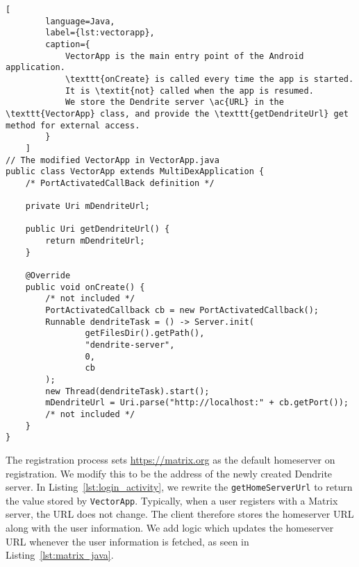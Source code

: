 \begin{lstfloat}
	\begin{lstlisting}[
        language=Java,
        label={lst:vectorapp},
        caption={
            VectorApp is the main entry point of the Android application.
            \texttt{onCreate} is called every time the app is started.
            It is \textit{not} called when the app is resumed.
            We store the Dendrite server \ac{URL} in the \texttt{VectorApp} class, and provide the \texttt{getDendriteUrl} get method for external access.
        }
    ]
// The modified VectorApp in VectorApp.java
public class VectorApp extends MultiDexApplication {
    /* PortActivatedCallBack definition */

    private Uri mDendriteUrl;

    public Uri getDendriteUrl() {
        return mDendriteUrl;
    }

    @Override
    public void onCreate() {
        /* not included */
        PortActivatedCallback cb = new PortActivatedCallback();
        Runnable dendriteTask = () -> Server.init(
                getFilesDir().getPath(),
                "dendrite-server",
                0,
                cb
        );
        new Thread(dendriteTask).start();
        mDendriteUrl = Uri.parse("http://localhost:" + cb.getPort());
        /* not included */
    }
}
\end{lstlisting}
\end{lstfloat}

The registration process sets \url{https://matrix.org} as the default homeserver on registration.
We modify this to be the address of the newly created Dendrite server.
In Listing~\ref{lst:login_activity}, we rewrite the \texttt{getHomeServerUrl} to return the value stored by \texttt{VectorApp}.
Typically, when a user registers with a Matrix server, the \ac{URL} does not change.
The client therefore stores the homeserver \ac{URL} along with the user information.
We add logic which updates the homeserver \ac{URL} whenever the user information is fetched, as seen in Listing~\ref{lst:matrix_java}.

